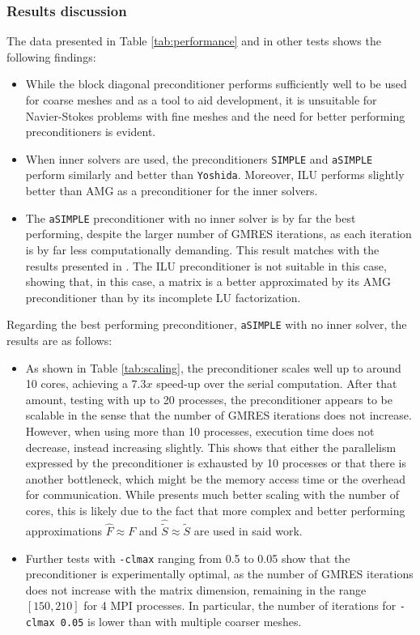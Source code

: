\subsubsection{Results discussion}
The data presented in Table \ref{tab:performance} and in other tests shows the following findings:
\begin{itemize}
    \item While the block diagonal preconditioner performs sufficiently well to be used for coarse meshes and as a tool to aid development, it is unsuitable for Navier-Stokes problems with fine meshes and the need for better performing preconditioners is evident.
    \item When inner solvers are used, the preconditioners \texttt{SIMPLE} and \texttt{aSIMPLE} perform similarly and better than \texttt{Yoshida}. Moreover, ILU performs slightly better than AMG as a preconditioner for the inner solvers.
    \item The \texttt{aSIMPLE} preconditioner with no inner solver is by far the best performing, despite the larger number of GMRES iterations, as each iteration is by far less computationally demanding. This result matches with the results presented in \cite{Quarteroni}. The ILU preconditioner is not suitable in this case, showing that, in this case, a matrix is a better approximated by its AMG preconditioner than by its incomplete LU factorization.
\end{itemize}
Regarding the best performing preconditioner, \texttt{aSIMPLE} with no inner solver, the results are as follows:
\begin{itemize}
    \item As shown in Table \ref{tab:scaling}, the preconditioner scales well up to around 10 cores, achieving a $7.3x$ speed-up over the serial computation. After that amount, testing with up to 20 processes, the preconditioner appears to be scalable in the sense that the number of GMRES iterations does not increase. However, when using more than 10 processes, execution time does not decrease, instead increasing slightly. This shows that either the parallelism expressed by the preconditioner is exhausted by 10 processes or that there is another bottleneck, which might be the memory access time or the overhead for communication. While \cite{Quarteroni} presents much better scaling with the number of cores, this is likely due to the fact that more complex and better performing approximations $\hat{F} \approx F$ and $\hat{\tilde{S}} \approx \tilde{S}$ are used in said work.
    \item Further tests with \texttt{-clmax} ranging from 0.5 to 0.05 show that the preconditioner is experimentally optimal, as the number of GMRES iterations does not increase with the matrix dimension, remaining in the range $[150, 210]$ for 4 MPI processes. In particular, the number of iterations for \texttt{-clmax 0.05} is lower than with multiple coarser meshes.
\end{itemize}